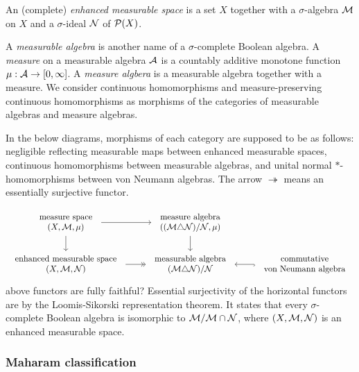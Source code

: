\documentclass{../../large}
\begin{document}
\begin{defn*}
An (complete) \emph{enhanced measurable space} is a set $X$ together with a $\sigma$-algebra $\mathcal{M}$ on $X$ and a $\sigma$-ideal $\mathcal{N}$ of $\mathcal{P}(X)$.
\end{defn*}
\begin{defn*}
A \emph{measurable algebra} is another name of a $\sigma$-complete Boolean algebra.
A \emph{measure} on a measurable algebra $\mathcal{A}$ is a countably additive monotone function $\mu:\mathcal{A}\to[0,\infty]$.
A \emph{measure algbera} is a measurable algebra together with a measure.
We consider continuous homomorphisms and measure-preserving continuous homomorphisms as morphisms of the categories of measurable algebras and measure algebras.
\end{defn*}

In the below diagrams, morphisms of each category are supposed to be as follows: negligible reflecting measurable maps between enhanced measurable spaces, continuous homomorphisms between measurable algebras, and unital normal $*$-homomorphisms between von Neumann algebras.
The arrow $\twoheadrightarrow$ means an essentially surjective functor.

\[\begin{tikzcd}
\tab{measure space\\$(X,\cM,\mu)$} \rar\dar &
\tab{measure algebra\\$((\cM\triangle\cN)/\cN,\mu)$} \dar \\
\tab{enhanced measurable space\\$(X,\cM,\cN)$} \rar[->>] &
\tab{measurable algebra\\$(\cM\triangle\cN)/\cN$} &
\tab{commutative\\von Neumann algebra} \lar[hook]
\end{tikzcd}\]
above functors are fully faithful?
Essential surjectivity of the horizontal functors are by the Loomis-Sikorski representation theorem.
It states that every $\sigma$-complete Boolean algebra is isomorphic to $\mathcal{M}/\mathcal{M}\cap\mathcal{N}$, where $(X,\mathcal{M},\mathcal{N})$ is an enhanced measurable space.

\begin{prb}
\end{prb}


\subsubsection*{Maharam classification}
\end{document}

